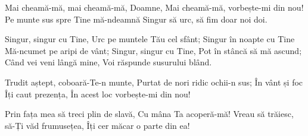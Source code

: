 \beginverse
Mai cheamă-mă, mai cheamă-mă, Doamne,
Mai cheamă-mă, vorbește-mi din nou!
Pe munte sus spre Tine mă-ndeamnă
Singur să urc, să fim doar noi doi.
\endverse

\beginchorus
Singur, singur cu Tine,
Urc pe muntele Tău cel sfânt;
Singur în noapte cu Tine
Mă-ncumet pe aripi de vânt;
Singur, singur cu Tine,
Pot în stâncă să mă ascund;
Când vei veni lângă mine,
Voi răspunde susurului blând.
\endchorus

\beginverse
Trudit aștept, coboară-Te-n munte,
Purtat de nori ridic ochii-n sus;
În vânt și foc Îți caut prezența,
În acest loc vorbește-mi din nou!
\endverse

\beginverse
Prin fața mea să treci plin de slavă,
Cu mâna Ta acoperă-mă!
Vreau să trăiesc, să-Ți văd frumusețea,
Îți cer măcar o parte din ea!
\endverse
\endsong